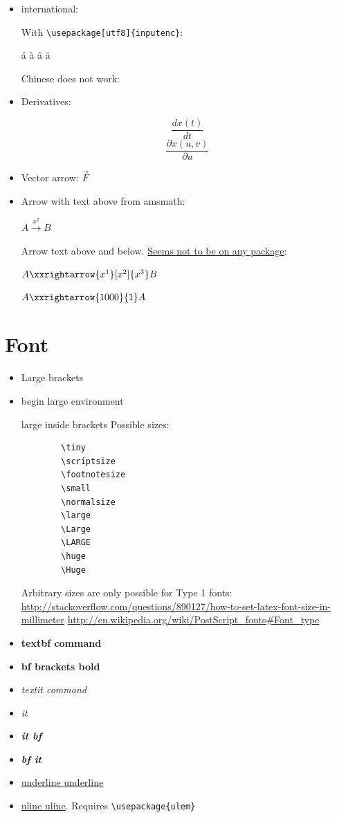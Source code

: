 \documentclass[12pt]{article}
\begin{document}
\begin{itemize}
    \item international:

      With \lstinline|\usepackage[utf8]{inputenc}|:

      á à â ä

      Chinese does not work: %

    \item Derivatives:

      $$ \frac{dx(t)}{dt} $$
      $$ \frac{\partial x(u,v)}{\partial u} $$

    \item Vector arrow: $\vec{F}$

    \item
      Arrow with text above from amsmath:

        $A\xrightarrow{x^2}B$

      Arrow text above and below. \href{http://tex.stackexchange.com/questions/27545/custom-length-arrows-text-over-and-under}{Seems not to be on any package}:

        $A\xxrightarrow{x^1}[x^2]{x^3}B$

        $A\xxrightarrow{1000}{1}A$
  \end{itemize}

\section{Font}\label{font}

  \begin{itemize}
    \item {\Large Large brackets}
    \item
      \begin{Large}begin large environment\end{Large}
      {\Large large inside brackets}
      Possible sizes:
      \begin{lstlisting}
        \tiny
        \scriptsize
        \footnotesize
        \small
        \normalsize
        \large
        \Large
        \LARGE
        \huge
        \Huge
      \end{lstlisting}

      Arbitrary sizes are only possible for Type 1 fonts: \url{http://stackoverflow.com/questions/890127/how-to-set-latex-font-size-in-millimeter}
      \url{http://en.wikipedia.org/wiki/PostScript_fonts#Font_type}
    \item \textbf{textbf command}
    \item {\bf bf brackets bold}
    \item \textit{textit command}
    \item {\it it}
    \item {\it \bf it bf}
    \item {\bf \it bf it}
    \item \underline{underline underline}
    \item \uline{uline uline}. Requires \lstinline|\usepackage{ulem}|
  \end{itemize}
\end{document}

